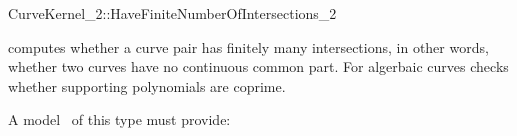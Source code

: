 \begin{ccRefFunctionObjectConcept}{CurveKernel_2::HaveFiniteNumberOfIntersections_2}

\ccDefinition
computes whether a curve pair has finitely many intersections, in other words, whether two curves have no continuous common part. For algerbaic curves checks whether supporting polynomials are
coprime.
 
\ccRefines 
{} 

\ccTypes
{}
\ccGlue
{}
\ccGlue
{}

\ccOperations
{}

A model \ccVar\ of this type must provide:

{}

\ccSeeAlso
{}\\

\end{ccRefFunctionObjectConcept}
